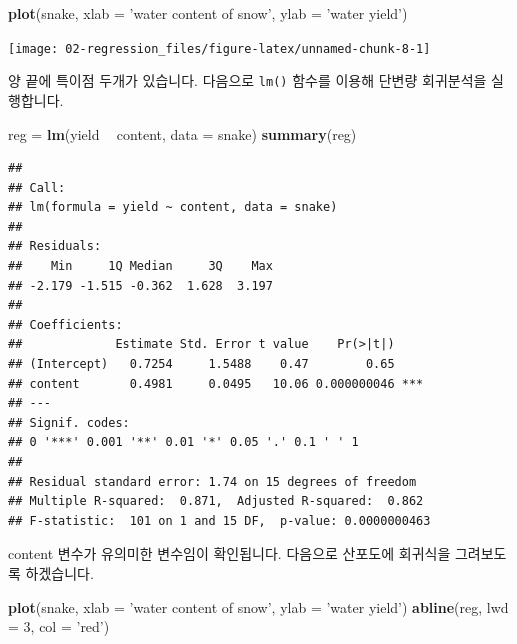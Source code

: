 \documentclass[12pt,]{book}
\newenvironment{Shaded}{\begin{snugshade}}{\end{snugshade}}
\newcommand{\DataTypeTok}[1]{\textcolor[rgb]{0.13,0.29,0.53}{#1}}
\newcommand{\DecValTok}[1]{\textcolor[rgb]{0.00,0.00,0.81}{#1}}
\newcommand{\KeywordTok}[1]{\textcolor[rgb]{0.13,0.29,0.53}{\textbf{#1}}}
\newcommand{\NormalTok}[1]{#1}
\newcommand{\OperatorTok}[1]{\textcolor[rgb]{0.81,0.36,0.00}{\textbf{#1}}}
\newcommand{\StringTok}[1]{\textcolor[rgb]{0.31,0.60,0.02}{#1}}
\begin{document}
\begin{Shaded}
\begin{Highlighting}[]
\KeywordTok{plot}\NormalTok{(snake, }\DataTypeTok{xlab =} \StringTok{'water content of snow'}\NormalTok{,}
     \DataTypeTok{ylab =} \StringTok{'water yield'}\NormalTok{)}
\end{Highlighting}
\end{Shaded}

\begin{center}\texttt{[image: 02-regression\_files/figure-latex/unnamed-chunk-8-1]} \end{center}

양 끝에 특이점 두개가 있습니다. 다음으로 \texttt{lm()} 함수를 이용해 단변량 회귀분석을 실행합니다.

\begin{Shaded}
\begin{Highlighting}[]
\NormalTok{reg =}\StringTok{ }\KeywordTok{lm}\NormalTok{(yield }\OperatorTok{~}\StringTok{ }\NormalTok{content, }\DataTypeTok{data =}\NormalTok{ snake)}
\KeywordTok{summary}\NormalTok{(reg)}
\end{Highlighting}
\end{Shaded}

\begin{verbatim}
## 
## Call:
## lm(formula = yield ~ content, data = snake)
## 
## Residuals:
##    Min     1Q Median     3Q    Max 
## -2.179 -1.515 -0.362  1.628  3.197 
## 
## Coefficients:
##             Estimate Std. Error t value    Pr(>|t|)    
## (Intercept)   0.7254     1.5488    0.47        0.65    
## content       0.4981     0.0495   10.06 0.000000046 ***
## ---
## Signif. codes:  
## 0 '***' 0.001 '**' 0.01 '*' 0.05 '.' 0.1 ' ' 1
## 
## Residual standard error: 1.74 on 15 degrees of freedom
## Multiple R-squared:  0.871,  Adjusted R-squared:  0.862 
## F-statistic:  101 on 1 and 15 DF,  p-value: 0.0000000463
\end{verbatim}

content 변수가 유의미한 변수임이 확인됩니다. 다음으로 산포도에 회귀식을 그려보도록 하겠습니다.

\begin{Shaded}
\begin{Highlighting}[]
\KeywordTok{plot}\NormalTok{(snake, }\DataTypeTok{xlab =} \StringTok{'water content of snow'}\NormalTok{,}
     \DataTypeTok{ylab =} \StringTok{'water yield'}\NormalTok{)}
\KeywordTok{abline}\NormalTok{(reg, }\DataTypeTok{lwd =} \DecValTok{3}\NormalTok{, }\DataTypeTok{col =} \StringTok{'red'}\NormalTok{)}
\end{Highlighting}
\end{Shaded}
\end{document}
